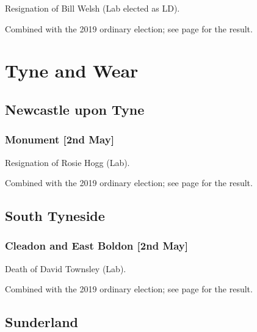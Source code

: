 \documentclass[a4paper,openany]{book}
\begin{document}
\begin{resultsiii}

Resignation of Bill Welsh (Lab elected as LD).

Combined with the 2019 ordinary election; see page \pageref{SeftonNorwood} for the result.

\section{Tyne and Wear}

\subsection*{Newcastle upon Tyne}

\subsubsection*{Monument \hspace*{\fill}\nolinebreak[1]%
	\enspace\hspace*{\fill}
	[2nd May]}


Resignation of Rosie Hogg (Lab).

Combined with the 2019 ordinary election; see page \pageref{NewcastleTyneMonument} for the result.

\subsection*{South Tyneside}

\subsubsection*{Cleadon and East Boldon \hspace*{\fill}\nolinebreak[1]%
	\enspace\hspace*{\fill}
	[2nd May]}


Death of David Townsley (Lab).

Combined with the 2019 ordinary election; see page \pageref{SouthTynesideCleadonEastBoldon} for the result.

\subsection*{Sunderland}


\end{resultsiii}
\end{document}
